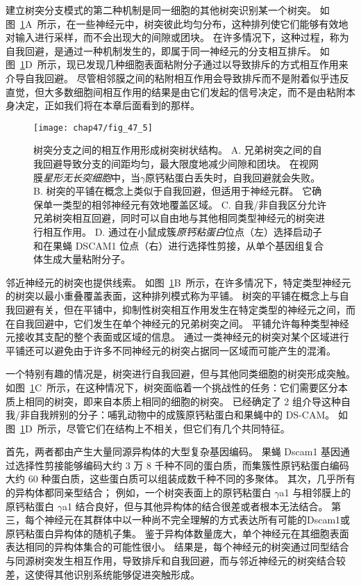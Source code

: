 建立树突分支模式的第二种机制是同一细胞的其他树突识别某一个树突。
如图~\ref{fig:47_5}A~所示，在一些神经元中，树突彼此均匀分布，这种排列使它们能够有效地对输入进行采样，而不会出现大的间隙或团块。
在许多情况下，这种过程，称为自我回避，是通过一种机制发生的，即属于同一神经元的分支相互排斥。
如图~\ref{fig:47_5}D~所示，现已发现几种细胞表面粘附分子通过以导致排斥的方式相互作用来介导自我回避。
尽管相邻膜之间的粘附相互作用会导致排斥而不是附着似乎违反直觉，但大多数细胞间相互作用的结果是由它们发起的信号决定，而不是由粘附本身决定，正如我们将在本章后面看到的那样。


\begin{figure}[htbp]
	\centering
	\texttt{[image: chap47/fig\_47\_5]}
	\caption{树突分支之间的相互作用形成树突树状结构。
		A. 兄弟树突之间的自我回避导致分支的间距均匀，最大限度地减少间隙和团块。
		在视网膜\textit{星形无长突细胞}中，当$\gamma$原钙粘蛋白丢失时，自我回避就会失败。
		B. 树突的平铺在概念上类似于自我回避，但适用于神经元群。
		它确保单一类型的相邻神经元有效地覆盖区域。
		C. 自我/非自我区分允许兄弟树突相互回避，同时可以自由地与其他相同类型神经元的树突进行相互作用。
		D. 通过在小鼠成簇\textit{原钙粘蛋白}位点（左）选择启动子和在果蝇 DSCAM1 位点（右）进行选择性剪接，从单个基因组复合体生成大量粘附分子。}
	\label{fig:47_5}
\end{figure}


邻近神经元的树突也提供线索。
如图~\ref{fig:47_5}B~所示，在许多情况下，特定类型神经元的树突以最小重叠覆盖表面，这种排列模式称为平铺。
树突的平铺在概念上与自我回避有关，但在平铺中，抑制性树突相互作用发生在特定类型的神经元之间，而在自我回避中，它们发生在单个神经元的兄弟树突之间。
平铺允许每种类型神经元接收其支配的整个表面或区域的信息。
通过一类神经元的树突对某个区域进行平铺还可以避免由于许多不同神经元的树突占据同一区域而可能产生的混淆。


一个特别有趣的情况是，树突进行自我回避，但与其他同类细胞的树突形成突触。
如图~\ref{fig:47_5}C~所示，在这种情况下，树突面临着一个挑战性的任务：它们需要区分本质上相同的树突，即来自本质上相同的细胞的树突。
已经确定了 2 组介导这种自我/非自我辨别的分子：哺乳动物中的成簇原钙粘蛋白和果蝇中的 DS-CAM。
如图~\ref{fig:47_5}D~所示，尽管它们在结构上不相关，但它们有几个共同特征。


首先，两者都由产生大量同源异构体的大型复杂基因编码。
果蝇 Dscam1 基因通过选择性剪接能够编码大约 3 万 8 千种不同的蛋白质，而集簇性原钙粘蛋白编码大约 60 种蛋白质，这些蛋白质可以组装成数千种不同的多聚体。
其次，几乎所有的异构体都同亲型结合；
例如，一个树突表面上的原钙粘蛋白 $\gamma$a1 与相邻膜上的原钙粘蛋白 $\gamma$a1 结合良好，但与其他异构体的结合很差或者根本无法结合。
第三，每个神经元在其群体中以一种尚不完全理解的方式表达所有可能的Dscam1或原钙粘蛋白异构体的随机子集。
鉴于异构体数量庞大，单个神经元在其细胞表面表达相同的异构体集合的可能性很小。
结果是，每个神经元的树突通过同型结合与同源树突发生相互作用，导致排斥和自我回避，而与邻近神经元的树突结合较差，这使得其他识别系统能够促进突触形成。


